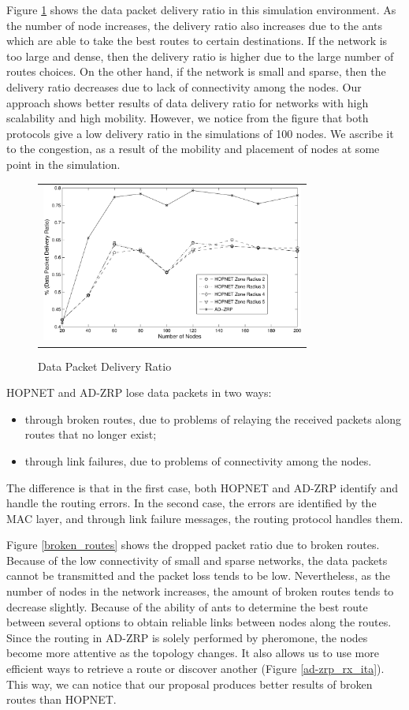 \documentclass[conference]{IEEEtran}
\begin{document}
Figure \ref{data_delivery_ratio} shows the data packet delivery ratio in this simulation environment.
As the number of node increases, the delivery ratio also increases due to the ants which are able to take the best routes to certain destinations.
If the network is too large and dense, then the delivery ratio is higher due to the large number of routes choices.
On the other hand, if the network is small and sparse, then the delivery ratio decreases due to lack of connectivity among the nodes.
Our approach shows better results of data delivery ratio for networks with high scalability and high mobility.
However, we notice from the figure that both protocols give a low delivery ratio in the simulations of 100 nodes.
We ascribe it to the congestion, as a result of the mobility and placement of nodes at some point in the simulation.

\begin{figure}[htb]
\begin{tabular}{c}
\includegraphics[width=245pt]{fig/data_delivery_ratio.pdf}
\end{tabular}
\caption{Data Packet Delivery Ratio}
\label{data_delivery_ratio}
\end{figure}

HOPNET and AD-ZRP lose data packets in two ways:
\begin{itemize}
\item
through broken routes, due to problems of relaying the received packets along routes that no longer exist;
\item
through link failures, due to problems of connectivity among the nodes.
\end{itemize}

The difference is that in the first case, both HOPNET and AD-ZRP identify and handle the routing errors.
In the second case, the errors are identified by the MAC layer, and through link failure messages, the routing protocol handles them.

Figure \ref{broken_routes} shows the dropped packet ratio due to broken routes.
Because of the low connectivity of small and sparse networks, the data packets cannot be transmitted and the packet loss tends to be low.
Nevertheless, as the number of nodes in the network increases, the amount of broken routes tends to decrease slightly.
Because of the ability of ants to determine the best route between several options to obtain reliable links between nodes along the routes.
Since the routing in AD-ZRP is solely performed by pheromone, the nodes become more attentive as the topology changes.
It also allows us to use more efficient ways to retrieve a route or discover another (Figure \ref{ad-zrp_rx_ita}).
This way, we can notice that our proposal produces better results of broken routes than HOPNET.
\end{document}
